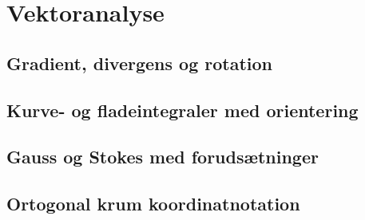 \chapter{Vektoranalyse}
\section{Gradient, divergens og rotation}
\leavevmode\par

\section{Kurve- og fladeintegraler med orientering}
\leavevmode\par

\section{Gauss og Stokes med forudsætninger}
\leavevmode\par

\section{Ortogonal krum koordinatnotation}
\leavevmode\par
